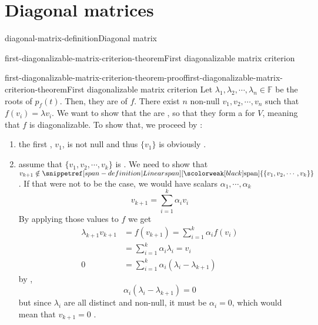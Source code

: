 \documentclass[preview]{standalone}
\begin{document}
\genpage

\section{Diagonal matrices}

\begin{snippetdefinition}{diagonal-matrix-definition}{Diagonal matrix}
    \todo
\end{snippetdefinition}

\begin{snippettheorem}{first-diagonalizable-matrix-criterion-theorem}{First diagonalizable matrix criterion}
    \todo
\end{snippettheorem}

\begin{snippetproof}{first-diagonalizable-matrix-criterion-theorem-proof}{first-diagonalizable-matrix-criterion-theorem}{First diagonalizable matrix criterion}
    Let \(\lambda_1, \lambda_2, \cdots, \lambda_n \in \mathbb{F}\) be the
    roots of \(p_f(t)\). Then, they are \eigenvalue[eigenvalues] of \(f\).
    There exist \(n\) non-null \vector[vectors] \(v_1, v_2, \cdots, v_n\)
    such that \(f(v_i) = \lambda v_i\). We want to show that the \eigenvector[eigenvectors]
    are \linearlyindependent, so that they form a \basis for \(V\), meaning
    that \(f\) is diagonalizable. %
    To show that, we proceed by \principleofinduction[induction]:
    \begin{enumerate}
        \item the first \vector,
        \(v_1\), is not null and thus \(\{v_1\}\) is obviously \linearlyindependent.
        \item assume that \(\{v_1, v_2, \cdots, v_k\}\) is \linearlyindependent. We need to show that
        \(v_{k+1} \notin \linearspan\{\{v_1, v_2, \cdots, v_k\}\}\).
        If that were not to be the case, we would have scalars \(\alpha_1, \cdots, \alpha_k\)
        \[
            v_{k+1} = \sum_{i=1}^k \alpha_i v_i
        \]
        By applying those values to \(f\) we get
        \begin{align*}
            \lambda_{k+1} v_{k+1} &= f(v_{k+1}) = \sum_{i=1}^k \alpha_i f(v_i) \\
            &= \sum_{i=1}^k \alpha_i \lambda_i = v_i \\
            0 &= \sum_{i=1}^k \alpha_i(\lambda_i - \lambda_{k+1})
        \end{align*}
        by ,
        \[
            \alpha_i(\lambda_i - \lambda_{k+1}) = 0
        \]
        but since \(\lambda_i\) are all distinct and non-null, it must be
        \(\alpha_i = 0\), which would mean that \(v_{k+1} = 0\) \lightning.
    \end{enumerate}
\end{snippetproof}
\end{document}
